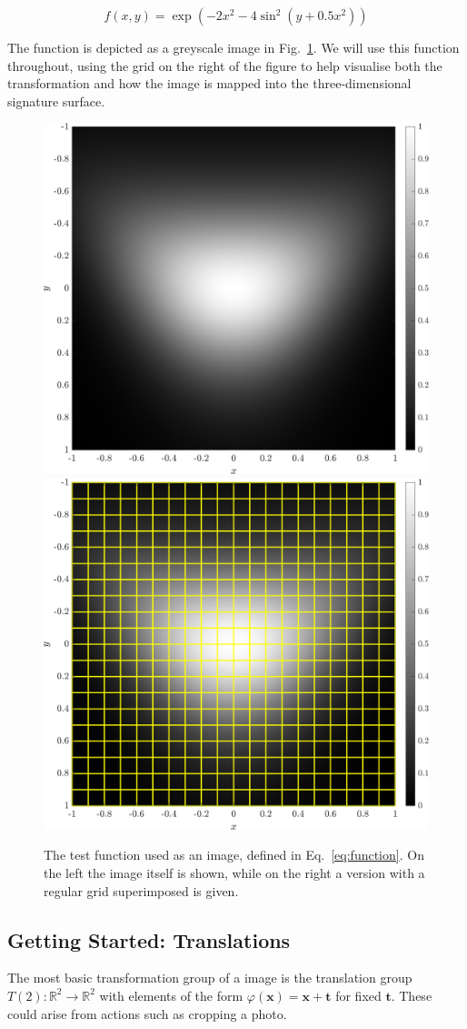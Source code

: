 \documentclass[review,onefignum,onetabnum]{siamonline190516}
\begin{document}
\begin{equation}\label{eq:function}
f(x, y) = \exp(-2x^2 - 4\sin^2(y + 0.5x^2))
\end{equation}

The function is depicted as a greyscale image in Fig.~\ref{fig:function}.
We will use this function throughout, using the grid on the right of the figure to help visualise both the transformation and how the image
is mapped into the three-dimensional signature surface. 

\begin{figure}
  \centering
  \includegraphics[width=.45\textwidth]{Figs/function}
  \includegraphics[width=.45\textwidth]{Figs/function_scanlines}
  \caption{The test function used as an image, defined in Eq.~\eqref{eq:function}.
On the left the image itself is shown, while on the right a version with a
regular grid superimposed is given. 
}\label{fig:function}
\end{figure}

\subsection{Getting Started: Translations}
\label{sec:T2}

The most basic transformation group of a image is the translation group
$T(2) \colon \mathbb{R}^2 \to \mathbb{R}^2$ with elements of the form
$\varphi(\mathbf{x}) = \mathbf{x} + \mathbf{t}$ for fixed $\mathbf{t}$.
These could arise from actions such as cropping a photo.
\end{document}

